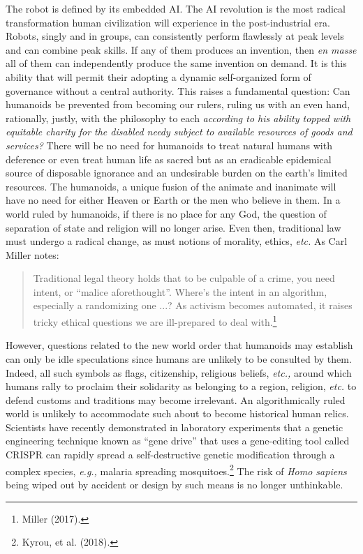 \begin{multicols}{2}
The robot is defined by its embedded AI. The AI revolution is the most radical transformation human civilization will experience in the post-industrial era. Robots, singly and in groups, can consistently perform flawlessly at peak levels and can combine peak skills. If any of them produces an invention, then \textit{en masse} all of them can independently produce the same invention on demand. It is this ability that will permit their adopting a dynamic self-organized form of governance without a central authority. This raises a fundamental question: Can humanoids be prevented from becoming our rulers, ruling us with an even hand, rationally, justly, with the philosophy to each \textit{according to his ability topped with equitable charity for the disabled needy subject to available resources of goods and services?} There will be no need for humanoids to treat natural humans with deference or even treat human life as sacred but as an eradicable epidemical source of disposable ignorance and an undesirable burden on the earth's limited resources. The humanoids, a unique fusion of the animate and inanimate will have no need for either Heaven or Earth or the men who believe in them. In a world ruled by humanoids, if there is no place for any God, the question of separation of state and religion will no longer arise. Even then, traditional law must undergo a radical change, as must notions of morality, ethics, \textit{etc.} As Carl Miller notes:
\begin{quote}
Traditional legal theory holds that to be culpable of a crime, you need intent, or “malice aforethought”. Where's the intent in an algorithm, especially a randomizing one ...? As activism becomes automated, it raises tricky ethical questions we are ill-prepared to deal with.\footnote{Miller (2017).}
\end{quote}

However, questions related to the new world order that humanoids may establish can only be idle speculations since humans are unlikely to be consulted by them. Indeed, all such symbols as flags, citizenship, religious beliefs, \textit{etc.,} around which humans rally to proclaim their solidarity as belonging to a region, religion, \textit{etc.} to defend customs and traditions may become irrelevant. An algorithmically ruled world is unlikely to accommodate such about to become historical human relics. Scientists have recently demonstrated in laboratory experiments that a genetic engineering technique known as “gene drive” that uses a gene-editing tool called CRISPR can rapidly spread a self-destructive genetic modification through a complex species, \textit{e.g.,} malaria spreading mosquitoes.\footnote{Kyrou, et al. (2018).}  The risk of \textit{Homo sapiens} being wiped out by accident or design by such means is no longer unthinkable.


\end{multicols}
